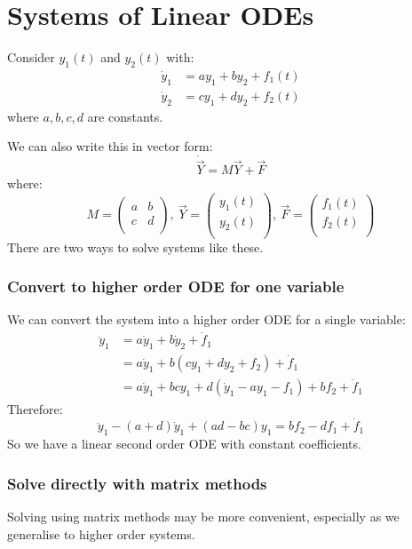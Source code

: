 \documentclass[../main.tex]{subfiles}
\begin{document}
\section{Systems of Linear ODEs}
Consider $y_1(t)$ and $y_2(t)$ with:
\begin{align*}
  \dot{y}_1 &= ay_1 + by_2 + f_1(t) \\
  \dot{y}_2 &= cy_1 + dy_2 + f_2(t)
\end{align*}
where $a, b, c, d$ are constants.

We can also write this in vector form:
\[
  \dot{\vec{Y}} = M\vec{Y} + \vec{F}
\]
where:
\[
  M = \begin{pmatrix}
  a & b \\
  c & d \\
  \end{pmatrix},\
  \vec{Y} = \begin{pmatrix}
  y_1(t) \\
  y_2(t) \\
  \end{pmatrix},\
  \vec{F} = \begin{pmatrix}
  f_1(t) \\
  f_2(t) \\
  \end{pmatrix}
\]
There are two ways to solve systems like these.
\subsubsection{Convert to higher order ODE for one variable}
We can convert the system into a higher order ODE for a single variable:
\begin{align*}
  \ddot{y}_1 &= a\dot{y}_1 + b\dot{y}_2 + \dot{f}_1 \\
             &= a\dot{y}_1 + b(cy_1 + dy_2 + f_2) + \dot{f}_1  \\
             &= a\dot{y}_1 + bcy_1 + d(\dot{y}_1 - ay_1 - f_1) + bf_2 + \dot{f}_1
\end{align*}
Therefore:
\[
  \ddot{y}_1 - (a + d)\dot{y}_1 + (ad - bc)y_1 = bf_2 - df_1 + \dot{f}_1
\]
So we have a linear second order ODE with constant coefficients.
\subsubsection{Solve directly with matrix methods}
Solving using matrix methods may be more convenient, especially as we generalise to higher order systems.
\end{document}
